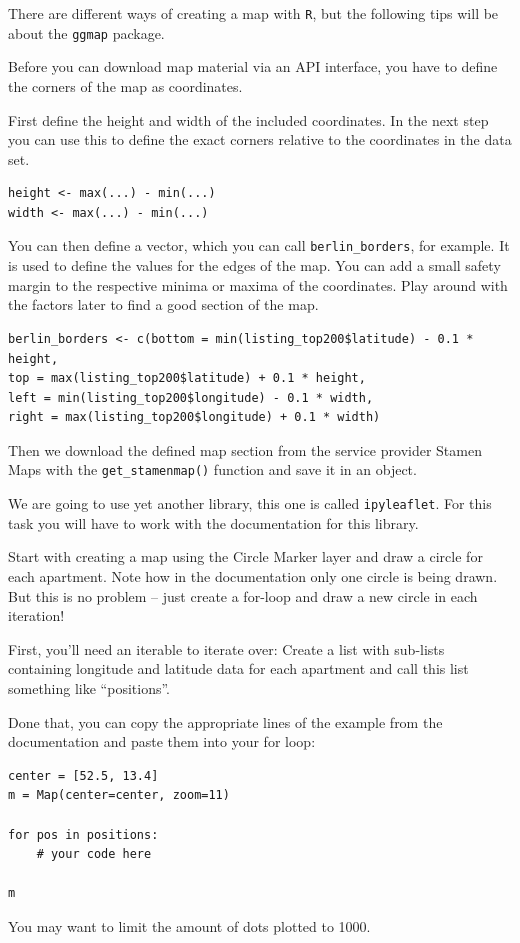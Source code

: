 \documentclass[
  11pt,
]{article}
\newenvironment{tips}[1]
  {
  \begin{itemize}
  \footnotesize
  \renewcommand{\labelitemi}{
    \raisebox{-.7\height}[0pt][0pt]{
      {\setkeys{Gin}{width=3em,keepaspectratio}
        \texttt{[image: images/\#1.png]}}
    }
  }
  \setlength{\fboxsep}{1em}
  \begin{rbox}
  \item
  }
  {
  \end{rbox}
  \end{itemize}
  }
\newenvironment{tipsp}[1]
  {
  \begin{itemize}
  \footnotesize
  \renewcommand{\labelitemi}{
    \raisebox{-.7\height}[0pt][0pt]{
      {\setkeys{Gin}{width=3em,keepaspectratio}
        \texttt{[image: images/\#1.png]}}
    }
  }
  \setlength{\fboxsep}{1em}
  \begin{pbox}
  \item
  }
  {
  \end{pbox}
  \end{itemize}
  }
\begin{document}
\begin{tips}r

There are different ways of creating a map with \texttt{R}, but the following tips will be about the \texttt{ggmap} package.

Before you can download map material via an API interface, you have to define the corners of the map as coordinates.

First define the height and width of the included coordinates. In the next step you can use this to define the exact corners relative to the coordinates in the data set.

\begin{verbatim}
height <- max(...) - min(...)
width <- max(...) - min(...)
\end{verbatim}

You can then define a vector, which you can call \texttt{berlin\_borders}, for example. It is used to define the values for the edges of the map. You can add a small safety margin to the respective minima or maxima of the coordinates. Play around with the factors later to find a good section of the map.

\begin{verbatim}
berlin_borders <- c(bottom = min(listing_top200$latitude) - 0.1 * height,
top = max(listing_top200$latitude) + 0.1 * height,
left = min(listing_top200$longitude) - 0.1 * width,
right = max(listing_top200$longitude) + 0.1 * width)
\end{verbatim}

Then we download the defined map section from the service provider Stamen Maps with the \texttt{get\_stamenmap()} function and save it in an object.

\end{tips}

\begin{tipsp}p

We are going to use yet another library, this one is called \texttt{ipyleaflet}. For this task you will have to work with the documentation for this library.

Start with creating a map using the Circle Marker layer and draw a circle for each apartment. Note how in the documentation only one circle is being drawn. But this is no problem -- just create a for-loop and draw a new circle in each iteration!

First, you'll need an iterable to iterate over: Create a list with sub-lists containing longitude and latitude data for each apartment and call this list something like ``positions''.

Done that, you can copy the appropriate lines of the example from the documentation and paste them into your for loop:

\begin{verbatim}
center = [52.5, 13.4]
m = Map(center=center, zoom=11)
 
for pos in positions:
    # your code here

m
\end{verbatim}

You may want to limit the amount of dots plotted to 1000.

\end{tipsp}
\end{document}
